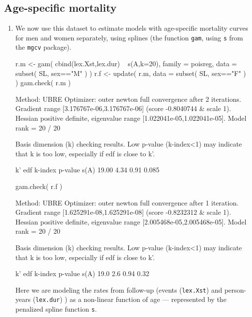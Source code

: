 \subsection*{Age-specific mortality}
 
\begin{enumerate}[resume]
  

\item We now use this dataset to estimate models with age-specific
  mortality curves for men and women separately, using splines (the
  function \texttt{gam}, using \texttt{s} from the \texttt{mgcv}
  package).
\begin{Schunk}
\begin{Sinput}
 r.m <- gam( cbind(lex.Xst,lex.dur) ~ s(A,k=20),
             family = poisreg,
               data = subset( SL, sex=="M" ) )
 r.f <- update( r.m, data = subset( SL, sex=="F" ) )
 gam.check( r.m )
\end{Sinput}
\begin{Soutput}
Method: UBRE   Optimizer: outer newton
full convergence after 2 iterations.
Gradient range [3.176767e-06,3.176767e-06]
(score -0.8040744 & scale 1).
Hessian positive definite, eigenvalue range [1.022041e-05,1.022041e-05].
Model rank =  20 / 20 

Basis dimension (k) checking results. Low p-value (k-index<1) may
indicate that k is too low, especially if edf is close to k'.

        k'   edf k-index p-value
s(A) 19.00  4.34    0.91   0.085
\end{Soutput}
\begin{Sinput}
 gam.check( r.f )
\end{Sinput}
\begin{Soutput}
Method: UBRE   Optimizer: outer newton
full convergence after 1 iteration.
Gradient range [1.625291e-08,1.625291e-08]
(score -0.8232312 & scale 1).
Hessian positive definite, eigenvalue range [2.005468e-05,2.005468e-05].
Model rank =  20 / 20 

Basis dimension (k) checking results. Low p-value (k-index<1) may
indicate that k is too low, especially if edf is close to k'.

       k'  edf k-index p-value
s(A) 19.0  2.6    0.94    0.32
\end{Soutput}
\end{Schunk}
Here we are modeling the rates from follow-up (events
(\texttt{lex.Xst}) and person-years (\texttt{lex.dur}) ) as
a non-linear function of age --- represented by the penalized spline
function \texttt{s}.




\end{enumerate}
